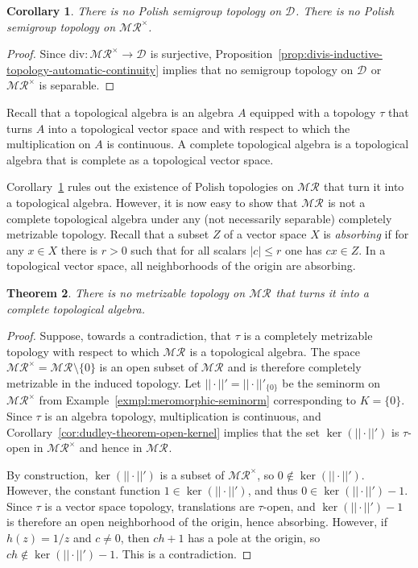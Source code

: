 \documentclass[12pt]{paper}
\numberwithin{equation}{section}
\theoremstyle{plain}
\newtheorem{theorem}{Theorem}[section]
\newtheorem{corollary}[theorem]{Corollary}
\theoremstyle{definition}
\newcommand{\merom}[1][]{\mathcal{MR}_{#1}}
\newcommand{\meromnz}{\merom^{\times}}
\newcommand{\divis}[1][]{\mathcal{D}_{#1}}
\newcommand{\dm}{\mathrm{div}}      %
\newcommand{\norm}[1]{||#1||}
\begin{document}
\begin{corollary}
  \label{cor:no-polish-topology}
  There is no Polish semigroup topology on \(\divis\). There is no Polish semigroup topology on
  \(\meromnz\).
\end{corollary}

\begin{proof}
  Since \(\dm : \meromnz \to \divis\) is surjective,
  Proposition~\ref{prop:divis-inductive-topology-automatic-continuity} implies that no semigroup
  topology on \(\divis\) or \(\meromnz\) is separable.
\end{proof}

Recall that a topological algebra is an algebra \(A\) equipped with a topology \(\tau\) that turns
\(A\) into a topological vector space and with respect to which the multiplication on \(A\) is
continuous.  A complete topological algebra is a topological algebra that is complete as a
topological vector space.

Corollary~\ref{cor:no-polish-topology} rules out the existence of Polish topologies on \(\merom\)
that turn it into a topological algebra.  However, it is now easy to show that \(\merom\) is not a
complete topological algebra under any (not necessarily separable) completely metrizable topology.
Recall that a subset \(Z\) of a vector space \(X\) is \emph{absorbing} if for any \(x \in X\) there
is \(r > 0\) such that for all scalars \(|c| \le r\) one has \(cx \in Z\).  In a topological vector
space, all neighborhoods of the origin are absorbing.

\begin{theorem}
  \label{thm:no-completely-metrizable-topological-algebra}
  There is no metrizable topology on \(\merom\) that turns it into a complete topological algebra.
\end{theorem}

\begin{proof}
  Suppose, towards a contradiction, that \(\tau\) is a completely metrizable topology with respect
  to which \(\merom\) is a topological algebra.  The space \(\meromnz = \merom \setminus \{0\} \) is
  an open subset of \(\merom\) and is therefore completely metrizable in the induced topology.  Let
  \(\norm{\cdot}' = \norm{\cdot}'_{\{0\}}\) be the seminorm on \(\meromnz\) from
  Example~\ref{exmpl:meromorphic-seminorm} corresponding to \(K = \{0\}\).  Since \(\tau\) is an
  algebra topology, multiplication is continuous, and Corollary~\ref{cor:dudley-theorem-open-kernel}
  implies that the set \(\ker(\norm{\cdot}')\) is \(\tau\)-open in \(\meromnz\) and hence in
  \(\merom\).

  By construction, \(\ker(\norm{\cdot}')\) is a subset of \(\meromnz\), so
  \(0 \not \in \ker(\norm{\cdot}')\).  However, the constant function \(1 \in \ker(\norm{\cdot}')\),
  and thus \(0 \in \ker(\norm{\cdot}') - 1\).  Since \(\tau\) is a vector space topology,
  translations are \(\tau\)-open, and \(\ker(\norm{\cdot}') - 1\) is therefore an open neighborhood
  of the origin, hence absorbing.  However, if \(h(z) = 1/z\) and \(c \ne 0\), then \(ch + 1\) has a
  pole at the origin, so \(ch \not \in \ker(\norm{\cdot}') - 1\). This is a contradiction.
\end{proof}
\end{document}
